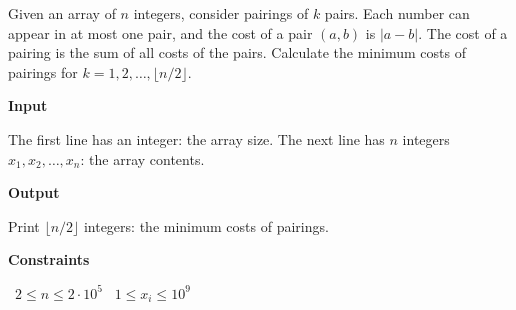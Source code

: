 Given an array of $n$ integers, consider pairings of $k$ pairs. Each number can appear in at most one pair, and the cost of a pair $(a,b)$ is $|a-b|$. The cost of a pairing is the sum of all costs of the pairs.
Calculate the minimum costs of pairings for $k=1,2,\dots,\lfloor n/2 \rfloor$.

\vspace{0.3cm}\noindent\textbf{Input}

The first line has an integer: the array size.
The next line has $n$ integers $x_1,x_2,\dots,x_n$: the array contents.

\vspace{0.3cm}\noindent\textbf{Output}

Print $\lfloor n/2 \rfloor$ integers: the minimum costs of pairings.

\vspace{0.3cm}\noindent\textbf{Constraints}

\textbullet\ $2 \le n \le 2 \cdot 10^5$
\textbullet\ $1 \le x_i \le 10^9$